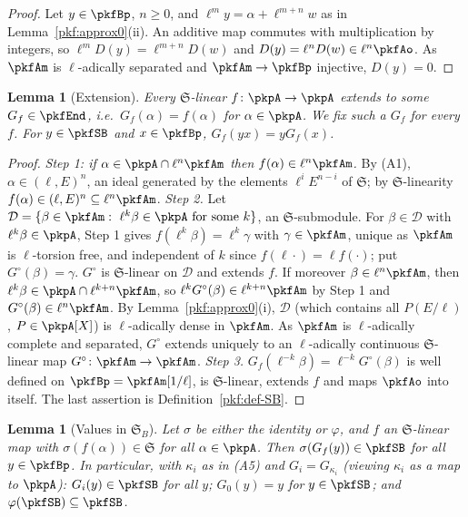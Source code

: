 \documentclass[10pt]{amsart}
\newtheorem{lemma}[theorem]{Lemma}
\theoremstyle{definition}
\theoremstyle{remark}
\begin{document}
\begin{proof}
Let $y\in\pkfBp$, $n\ge0$, and $\ell^my=\alpha+\ell^{m+n}w$ as in Lemma~\ref{pkf:approx0}(ii). An
additive map commutes with multiplication by integers, so $\ell^mD(y)=\ell^{m+n}D(w)$ and $D(y)=
\ell^nD(w)\in\ell^n\pkfAo$. As $\pkfAm$ is $\ell$-adically separated and $\pkfAm\to\pkfBp$ injective,
$D(y)=0$.
\end{proof}

\begin{lemma}[Extension]\label{pkf:extend}
Every $\mathfrak S$-linear $f\colon\pkpA\to\pkpA$ extends to some $G_f\in\pkfEnd$, i.e.\
$G_f(\alpha)=f(\alpha)$ for $\alpha\in\pkpA$. We fix such a $G_f$ for every $f$. For $y\in\pkfSB$ and
$x\in\pkfBp$, $G_f(yx)=yG_f(x)$.
\end{lemma}

\begin{proof}
\emph{Step 1: if $\alpha\in\pkpA\cap\ell^n\pkfAm$ then $f(\alpha)\in\ell^n\pkfAm$.} By (A1),
$\alpha\in(\ell,E)^n$, an ideal generated by the elements $\ell^iE^{n-i}$ of $\mathfrak S$; by
$\mathfrak S$-linearity $f(\alpha)\in(\ell,E)^n\subseteq\ell^n\pkfAm$.
\emph{Step 2.} Let $\mathcal D=\{\beta\in\pkfAm:\ \ell^k\beta\in\pkpA\text{ for some }k\}$, an
$\mathfrak S$-submodule. For $\beta\in\mathcal D$ with $\ell^k\beta\in\pkpA$, Step 1 gives
$f(\ell^k\beta)=\ell^k\gamma$ with $\gamma\in\pkfAm$, unique as $\pkfAm$ is $\ell$-torsion free, and
independent of $k$ since $f(\ell\cdot)=\ell f(\cdot)$; put $G^\circ(\beta)=\gamma$. $G^\circ$ is $\mathfrak S$-linear
on $\mathcal D$ and extends $f$. If moreover $\beta\in\ell^n\pkfAm$, then $\ell^k\beta\in\pkpA\cap
\ell^{k+n}\pkfAm$, so $\ell^k G^\circ(\beta)\in\ell^{k+n}\pkfAm$ by Step 1 and $G^\circ(\beta)\in\ell^n\pkfAm$.
By Lemma~\ref{pkf:approx0}(i), $\mathcal D$ (which contains all $P(E/\ell)$, $P\in\pkpA[X]$) is
$\ell$-adically dense in $\pkfAm$. As $\pkfAm$ is $\ell$-adically complete and separated, $G^\circ$ extends
uniquely to an $\ell$-adically continuous $\mathfrak S$-linear map $G^\circ\colon\pkfAm\to\pkfAm$.
\emph{Step 3.} $G_f(\ell^{-k}\beta)=\ell^{-k}G^\circ(\beta)$ is well defined on $\pkfBp=\pkfAm[1/\ell]$, is
$\mathfrak S$-linear, extends $f$ and maps $\pkfAo$ into itself. The last assertion is
Definition~\ref{pkf:def-SB}.
\end{proof}

\begin{lemma}[Values in $\mathfrak S_B$]\label{pkf:values}
Let $\sigma$ be either the identity or $\varphi$, and $f$ an $\mathfrak S$-linear map with
$\sigma(f(\alpha))\in\mathfrak S$ for all $\alpha\in\pkpA$. Then $\sigma(G_f(y))\in\pkfSB$ for all
$y\in\pkfBp$. In particular, with $\kappa_i$ as in (A5) and $G_i=G_{\kappa_i}$ (viewing $\kappa_i$ as a
map to $\pkpA$): $G_i(y)\in\pkfSB$ for all $y$; $G_0(y)=y$ for $y\in\pkfSB$; and
$\varphi(\pkfSB)\subseteq\pkfSB$.
\end{lemma}
\end{document}
